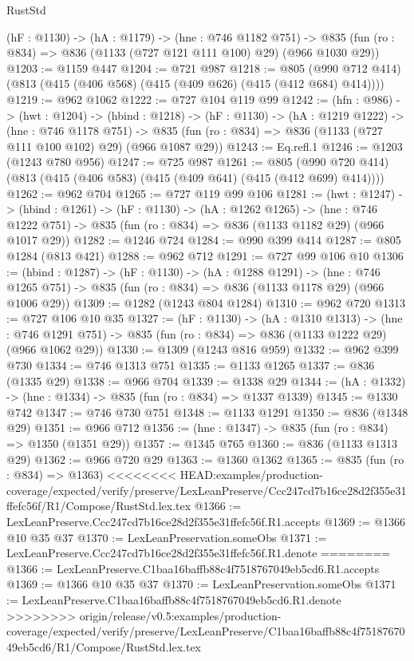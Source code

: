\begin{lexlean}{RustStd}
\begin{coremodule}
{\begin{coremodule}
  (hF : @1130) ->
  (hA : @1179) ->
  (hne : @746 @1182 @751) ->
  @835 (fun (ro : @834) => @836 (@1133 (@727 @121 @111 @100) @29) (@966 @1030 @29))
@1203 := @1159 @447
@1204 := @721 @987
@1218 := @805 (@990 @712 @414) (@813 (@415 (@406 @568) (@415 (@409 @626) (@415 (@412 @684) @414))))
@1219 := @962 @1062
@1222 := @727 @104 @119 @99
@1242 := (hfn : @986) ->
  (hwt : @1204) ->
  (hbind : @1218) ->
  (hF : @1130) ->
  (hA : @1219 @1222) ->
  (hne : @746 @1178 @751) ->
  @835 (fun (ro : @834) => @836 (@1133 (@727 @111 @100 @102) @29) (@966 @1087 @29))
@1243 := Eq.refl.{1}
@1246 := @1203 (@1243 @780 @956)
@1247 := @725 @987
@1261 := @805 (@990 @720 @414) (@813 (@415 (@406 @583) (@415 (@409 @641) (@415 (@412 @699) @414))))
@1262 := @962 @704
@1265 := @727 @119 @99 @106
@1281 := (hwt : @1247) ->
  (hbind : @1261) ->
  (hF : @1130) ->
  (hA : @1262 @1265) ->
  (hne : @746 @1222 @751) -> @835 (fun (ro : @834) => @836 (@1133 @1182 @29) (@966 @1017 @29))
@1282 := @1246 @724
@1284 := @990 @399 @414
@1287 := @805 @1284 (@813 @421)
@1288 := @962 @712
@1291 := @727 @99 @106 @10
@1306 := (hbind : @1287) ->
  (hF : @1130) ->
  (hA : @1288 @1291) ->
  (hne : @746 @1265 @751) -> @835 (fun (ro : @834) => @836 (@1133 @1178 @29) (@966 @1006 @29))
@1309 := @1282 (@1243 @804 @1284)
@1310 := @962 @720
@1313 := @727 @106 @10 @35
@1327 := (hF : @1130) ->
  (hA : @1310 @1313) ->
  (hne : @746 @1291 @751) -> @835 (fun (ro : @834) => @836 (@1133 @1222 @29) (@966 @1062 @29))
@1330 := @1309 (@1243 @816 @959)
@1332 := @962 @399 @730
@1334 := @746 @1313 @751
@1335 := @1133 @1265
@1337 := @836 (@1335 @29)
@1338 := @966 @704
@1339 := @1338 @29
@1344 := (hA : @1332) -> (hne : @1334) -> @835 (fun (ro : @834) => @1337 @1339)
@1345 := @1330 @742
@1347 := @746 @730 @751
@1348 := @1133 @1291
@1350 := @836 (@1348 @29)
@1351 := @966 @712
@1356 := (hne : @1347) -> @835 (fun (ro : @834) => @1350 (@1351 @29))
@1357 := @1345 @765
@1360 := @836 (@1133 @1313 @29)
@1362 := @966 @720 @29
@1363 := @1360 @1362
@1365 := @835 (fun (ro : @834) => @1363)
<<<<<<<< HEAD:examples/production-coverage/expected/verify/preserve/LexLeanPreserve/Ccc247cd7b16ce28d2f355e31ffefc56f/R1/Compose/RustStd.lex.tex
@1366 := LexLeanPreserve.Ccc247cd7b16ce28d2f355e31ffefc56f.R1.accepts
@1369 := @1366 @10 @35 @37
@1370 := LexLeanPreservation.someObs
@1371 := LexLeanPreserve.Ccc247cd7b16ce28d2f355e31ffefc56f.R1.denote
========
@1366 := LexLeanPreserve.C1baa16baffb88c4f7518767049eb5cd6.R1.accepts
@1369 := @1366 @10 @35 @37
@1370 := LexLeanPreservation.someObs
@1371 := LexLeanPreserve.C1baa16baffb88c4f7518767049eb5cd6.R1.denote
>>>>>>>> origin/release/v0.5:examples/production-coverage/expected/verify/preserve/LexLeanPreserve/C1baa16baffb88c4f7518767049eb5cd6/R1/Compose/RustStd.lex.tex

\end{coremodule}}
\end{coremodule}
\end{lexlean}
